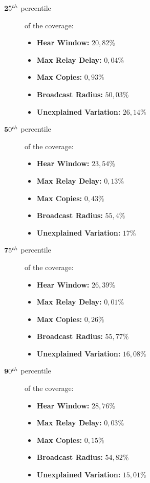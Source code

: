 \begin{description}
	\item [$\textbf 25^{th}$ percentile] of the coverage:
		\begin{itemize}
			\item \textbf{Hear Window:} \(20,82\%\)
			\item \textbf{Max Relay Delay:} \(0,04\%\)
			\item \textbf{Max Copies:} \(0,93\%\)
			\item \textbf{Broadcast Radius:} \(50,03\%\)
			\item \textbf{Unexplained Variation:} \(26,14\%\)
		\end{itemize}
	\item [$\textbf 50^{th}$ percentile] of the coverage:
		\begin{itemize}
			\item \textbf{Hear Window:} \(23,54\%\)
			\item \textbf{Max Relay Delay:} \(0,13\%\)
			\item \textbf{Max Copies:} \(0,43\%\)
			\item \textbf{Broadcast Radius:} \(55,4\%\)
			\item \textbf{Unexplained Variation:} \(17\%\)
		\end{itemize}
	\item [$\textbf 75^{th}$ percentile] of the coverage:
		\begin{itemize}
			\item \textbf{Hear Window:} \(26,39\%\)
			\item \textbf{Max Relay Delay:} \(0,01\%\)
			\item \textbf{Max Copies:} \(0,26\%\)
			\item \textbf{Broadcast Radius:} \(55,77\%\)
			\item \textbf{Unexplained Variation:} \(16,08\%\)
		\end{itemize}
	\item [$\textbf 90^{th}$ percentile] of the coverage:
		\begin{itemize}
			\item \textbf{Hear Window:} \(28,76\%\)
			\item \textbf{Max Relay Delay:} \(0,03\%\)
			\item \textbf{Max Copies:} \(0,15\%\)
			\item \textbf{Broadcast Radius:} \(54,82\%\)
			\item \textbf{Unexplained Variation:} \(15,01\%\)
		\end{itemize}

\end{description}
